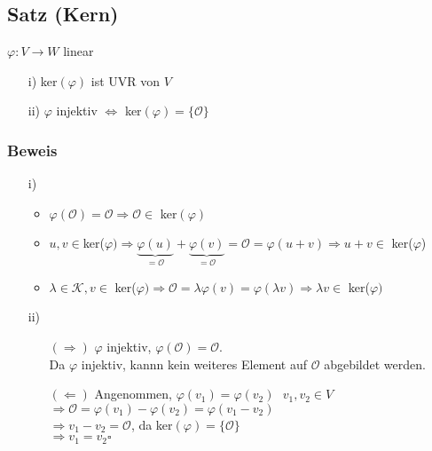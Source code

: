 \documentclass[a4paper, 12pt,titlepage, pdf, headsepline]{article}
\newcommand{\K}{\mathcal{K}}
\newcommand{\qed}{\hfill$\square$}
\renewcommand{\>}{\rightarrow}
\renewcommand{\*}{\cdot}
\renewcommand{\O}{\mathcal{O}}
\renewcommand{\phi}{\varphi}
\begin{document}
		      			\subsection{Satz (Kern)}
		      			\label{6.9}
		      			$\phi: V \rightarrow W$ linear
		      			\begin{itemize}
		      				\item[i)] ker$(\phi)$ ist UVR von $V$
		      				\item[ii)] $\phi$ injektiv $\Leftrightarrow$ ker$(\phi) = \{\O\}$
		      			\end{itemize}
		      			\subsubsection*{Beweis}
		      			\begin{itemize}
		      				\item[i)]
		      				      \begin{itemize}
		      				      	\item $\phi(\O) = \mathcal{O} \Rightarrow \mathcal{O} \in$ ker$(\phi)$
		      				      	\item $u,v \in $ker($\phi) \Rightarrow \underbrace{\phi(u)}_{= \O} + \underbrace{\phi(v)}_{=\O} = \O = \phi(u+v) \Rightarrow u+v \in $ ker($\phi$)
		      				      	\item $\lambda \in \K, v \in $ ker($\phi) \Rightarrow \O = \lambda \phi(v) = \phi(\lambda v) \Rightarrow \lambda v \in $ ker($\phi)$
		      				      \end{itemize}
		      				\item[ii)]
		      				      \begin{itemize}
		      				      	\item[$(\Rightarrow)$] $\phi$ injektiv, $\phi(\O) = \O$.\\ Da $\phi$ injektiv, kannn kein weiteres Element auf $\O$ abgebildet werden.
		      				      	\item[$(\Leftarrow)$] Angenommen, $\phi(v_1) = \phi(v_2)~~~ v_1, v_2 \in V$ \\
		      				      	      $\Rightarrow \O = \phi(v_1) - \phi(v_2) = \phi(v_1 - v_2)$ \\
		      				      	      $\Rightarrow v_1  - v_2 = \O$, da ker$(\phi) = \{\O\}$\\
		      				      	      $\Rightarrow v_1 = v_2 $\qed
		      				      \end{itemize}
		      			\end{itemize}
\end{document}
